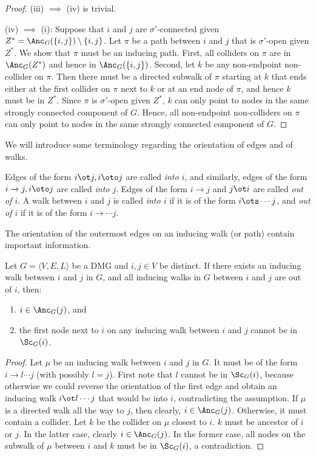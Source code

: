 \begin{proof}
  (iii) $\implies$ (iv) is trivial.

  (iv) $\implies$ (i): Suppose that %
  $i$ and $j$ are $\sigma'$-connected given $Z^* = \Anc_{G}(\{i,j\}) \setminus \{i,j\}$. 
  Let $\pi$ be a path between $i$ and $j$ that is $\sigma'$-open given $Z^*$.
  We show that $\pi$ must be an inducing path. 
  First, all colliders on $\pi$ are in $\Anc_{G}(Z^*)$ and hence in $\Anc_{G}(\{i,j\})$. 
  Second, let $k$ be any non-endpoint non-collider on $\pi$.
  Then there must be a directed subwalk of $\pi$ starting at $k$ that ends either at the first collider on $\pi$ next to $k$ or at an end node of $\pi$, and hence $k$ must be in $Z^*$. 
  Since $\pi$ is $\sigma'$-open given $Z^*$, $k$ can only point to nodes in the same strongly connected component of $G$.
  Hence, all non-endpoint non-colliders on $\pi$ can only point to nodes in the same strongly connected component of $G$.
\end{proof}

We will introduce some terminology regarding the orientation of edges and of walks.
\begin{Def}
Edges of the form $i \ot j, i \oto j$ are called \emph{into $i$}, and similarly, edges of the form $i \to j, i \oto j$ are called \emph{into $j$}. 
Edges of the form $i \to j$ and $j \ot i$ are called \emph{out of $i$}.
A walk between $i$ and $j$ is called \emph{into $i$} if it is of the form $i \ots \cdots j$, and \emph{out of $i$} if it is of the form $i \to \cdots j$.
\end{Def}
The orientation of the outermost edges on an inducing walk (or path) contain important information.
\begin{Lem}\label{lem:inducing_walks_out_of}
  Let $G = \langle V,E,L \rangle$ be a DMG and $i,j \in V$ be distinct. 
  If there exists an inducing walk between $i$ and $j$ in $G$,
  and all inducing walks in $G$ between $i$ and $j$ are out of $i$, then:
  \begin{enumerate}
    \item $i \in \Anc_G(j)$, and
    \item the first node next to $i$ on any inducing walk between $i$ and $j$ cannot be in $\Sc_G(i)$.
  \end{enumerate}
\end{Lem}
\begin{proof}
  Let $\mu$ be an inducing walk between $i$ and $j$ in $G$. 
  It must be of the form $i \to l \cdots j$ (with possibly $l = j$). 
  First note that $l$ cannot be in $\Sc_G(i)$, because otherwise we could reverse the orientation of the first edge and obtain an inducing walk $i \ot l \cdots j$ that would be into $i$, contradicting the assumption.
  If $\mu$ is a directed walk all the way to $j$, then clearly, $i \in \Anc_G(j)$.
  Otherwise, it must contain a collider. 
  Let $k$ be the collider on $\mu$ closest to $i$.
  $k$ must be ancestor of $i$ or $j$. 
  In the latter case, clearly $i \in \Anc_G(j)$.
  In the former case, all nodes on the subwalk of $\mu$ between $i$ and $k$ must be in $\Sc_G(i)$, a contradiction.
\end{proof}

